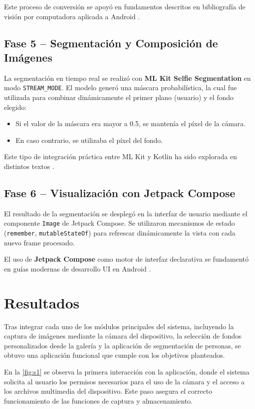 \documentclass[conference]{IEEEtran}
\begin{document}
Este proceso de conversión se apoyó en fundamentos descritos en bibliografía de visión por computadora aplicada a Android \cite{mlkitbook}.  

\subsection{Fase 5 – Segmentación y Composición de Imágenes}
La segmentación en tiempo real se realizó con \textbf{ML Kit Selfie Segmentation} en modo \texttt{STREAM\_MODE}. El modelo generó una máscara probabilística, la cual fue utilizada para combinar dinámicamente el primer plano (usuario) y el fondo elegido:  

\begin{itemize}
    \item Si el valor de la máscara era mayor a 0.5, se mantenía el píxel de la cámara.  
    \item En caso contrario, se utilizaba el píxel del fondo.  
\end{itemize}

Este tipo de integración práctica entre ML Kit y Kotlin ha sido explorada en distintos textos \cite{mlkotlin}.  

\subsection{Fase 6 – Visualización con Jetpack Compose}
El resultado de la segmentación se desplegó en la interfaz de usuario mediante el componente \texttt{Image} de Jetpack Compose. Se utilizaron mecanismos de estado (\texttt{remember}, \texttt{mutableStateOf}) para refrescar dinámicamente la vista con cada nuevo frame procesado.  

El uso de \textbf{Jetpack Compose} como motor de interfaz declarativa se fundamentó en guías modernas de desarrollo UI en Android \cite{bignerdkotlin, jetpackbook}.  


\section{Resultados} 
Tras integrar cada uno de los módulos principales del sistema, incluyendo la captura de imágenes mediante la cámara del dispositivo, la selección de fondos personalizados desde la galería y la aplicación de segmentación de personas, se obtuvo una aplicación funcional que cumple con los objetivos planteados.

En la \textcolor{red}{\autoref{fig:s1}} se observa la primera interacción con la aplicación, donde el sistema solicita al usuario los permisos necesarios para el uso de la cámara y el acceso a los archivos multimedia del dispositivo. Este paso asegura el correcto funcionamiento de las funciones de captura y almacenamiento.\newpage
\end{document}

